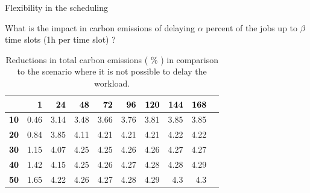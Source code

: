\documentclass[Ligatures=TeX,table,svgnames,usetotalslideindicator,compress,10pt,aspectratio=169]{beamer}
\begin{document}
\begin{frame}{Flexibility in the scheduling}
  
  What is the impact in carbon emissions of delaying $\alpha$ percent of the jobs up to $\beta$ time slots (1h per time slot) ?

  \begin{table}[h]
\caption{Reductions in total carbon emissions ( \% ) in comparison to the scenario where it is not possible to delay the workload. }\centering
\label{tab:flex_scheduling}
\begin{tabular}{|l|r|r|r|r|r|r|r|r|r|}
  \hline
  \small
\backslashbox{$\alpha$}{$\beta$} &   \textcolor{black}{\textbf{ 1}} &  \textcolor{black}{\textbf{ 24 }} &  \textcolor{black}{\textbf{ 48 }}  &   \textcolor{black}{\textbf{ 72 }} &   \textcolor{black}{\textbf{ 96 }} &   \textcolor{black}{\textbf{ 120  }} &   \textcolor{black}{\textbf{ 144 }} &   \textcolor{black}{\textbf{ 168 }} \\ 
     \hline
 \textcolor{black}{ \textbf{10}}   &  0.46  &  3.14 &  3.48 &  3.66 &  3.76 &  3.81 &  3.85 &  3.85 \\ 
\hline
 \textcolor{black}{ \textbf{20}}   &  0.84  &  3.85 &  4.11 &  4.21 &  4.21 &  4.21 &  4.22 &  4.22 \\ 
\hline
 \textcolor{black}{ \textbf{30}}   &  1.15  &  4.07 &  4.25 &  4.25 &  4.26 &  4.26 &  4.27 &  4.27 \\ 
\hline
 \textcolor{black}{ \textbf{40}}   &  1.42  &  4.15 &  4.25 &  4.26 &  4.27 &  4.28 &  4.28 &  4.29 \\ 
\hline
 \textcolor{black}{ \textbf{50}}   &  1.65  &  4.22 &  4.26 &  4.27 &  4.28 &  4.29 &  4.3 &  4.3 \\ 
\hline
\end{tabular}
\end{table}

\end{frame}
\end{document}
